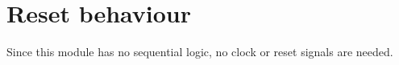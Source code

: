 \section{Reset behaviour}

Since this module has no sequential logic, no clock or reset signals are needed.

